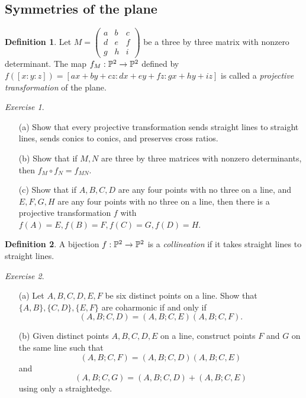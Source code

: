 \documentclass[letterpaper,11pt]{article}
\theoremstyle{definition}
\newtheorem{defn}{Definition}
\theoremstyle{remark}
\newtheorem{exer}{Exercise}
\begin{document}
\subsection{Symmetries of the plane}

\begin{defn} Let $M = \left(\begin{array}{ccc}a & b & c\\ d & e & f\\ g & h & i\end{array}\right)$ be a three by three matrix with nonzero determinant. The map $f_M:\mathbb{P}^2\rightarrow \mathbb{P}^2$ defined by $f([x:y:z]) = [ax+by+cz:dx+ey+fz:gx+hy+iz]$ is called a \emph{projective transformation} of the plane.
\end{defn}

\begin{exer}\label{projective-trans}
\begin{itemize}
\item[(a)] Show that every projective transformation sends straight lines to straight lines, sends conics to conics, and preserves cross ratios.

\item[(b)] Show that if $M,N$ are three by three matrices with nonzero determinants, then $f_M\circ f_N = f_{MN}$.

\item[(c)] Show that if $A,B,C,D$ are any four points with no three on a line, and $E,F,G,H$ are any four points with no three on a line, then there is a projective transformation $f$ with $f(A) = E, f(B) = F, f(C) = G, f(D) = H$.
\end{itemize}
\end{exer}

\begin{defn} A bijection $f:\mathbb{P}^2 \rightarrow \mathbb{P}^2$ is a \emph{collineation} if it takes straight lines to straight lines.
\end{defn}

\begin{exer}\label{cr-arithmetic}
\begin{itemize}
\item[(a)] Let $A,B,C,D,E,F$ be six distinct points on a line. Show that $\{A,B\},\{C,D\},\{E,F\}$ are coharmonic if and only if
\[
(A,B;C,D) = (A,B;C,E)(A,B;C,F).
\]

\item[(b)] Given distinct points $A,B,C,D,E$ on a line, construct points $F$ and $G$ on the same line such that
\[
(A,B;C,F) = (A,B;C,D)(A,B;C,E)
\]
and
\[
(A,B;C,G) = (A,B;C,D) + (A,B;C,E)
\]
using only a straightedge.
\end{itemize}
\end{exer}
\end{document}
